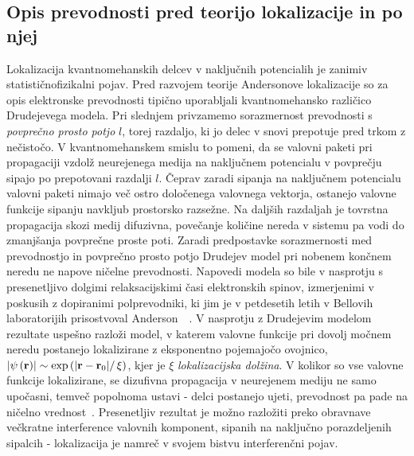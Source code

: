  \subsection{Opis prevodnosti pred teorijo lokalizacije in po njej}  
 Lokalizacija kvantnomehanskih delcev v naključnih potencialih je zanimiv statističnofizikalni pojav. Pred razvojem teorije Andersonove lokalizacije so za opis elektronske prevodnosti tipično uporabljali kvantnomehansko različico Drudejevega modela. Pri slednjem privzamemo sorazmernost prevodnosti s \emph{povprečno prosto potjo} $l$, torej razdaljo, ki jo delec v snovi prepotuje pred trkom z nečistočo. V kvantnomehanskem smislu to pomeni, da se valovni paketi pri propagaciji vzdolž neurejenega medija na naključnem potencialu v povprečju sipajo po prepotovani razdalji $l$. Čeprav zaradi sipanja na naključnem potencialu valovni paketi nimajo več ostro določenega valovnega vektorja, ostanejo valovne funkcije sipanju navkljub prostorsko razsežne. Na daljših razdaljah je tovrstna propagacija skozi medij difuzivna, povečanje količine nereda v sistemu pa vodi do zmanjšanja povprečne proste poti. Zaradi predpostavke sorazmernosti med prevodnostjo in povprečno prosto potjo Drudejev model pri nobenem končnem neredu ne napove ničelne prevodnosti. Napovedi modela so bile v nasprotju s presenetljivo dolgimi relaksacijskimi časi elektronskih spinov, izmerjenimi v poskusih z dopiranimi polprevodniki, ki jim je v petdesetih letih v Bellovih laboratorijih prisostvoval Anderson~\cite{lagendijk2009fifty}~\cite{anderson1978local}. V nasprotju z Drudejevim modelom rezultate uspešno razloži model, v katerem valovne funkcije pri dovolj močnem neredu postanejo lokalizirane z eksponentno pojemajočo ovojnico, $\left|\psi\left(\textbf{r}\right)\right|   \sim \exp\left(\left|\textbf{r}- \textbf{r}_0\right|\right/\xi)$, kjer je $\xi$ \emph{lokalizacijska dolžina}. V kolikor so vse valovne funkcije lokalizirane, se dizufivna propagacija v neurejenem mediju ne samo upočasni, temveč popolnoma ustavi - delci postanejo ujeti, prevodnost pa pade na ničelno vrednost~\cite{wolfle2010self}. Presenetljiv rezultat je možno razložiti preko obravnave večkratne interference valovnih komponent, sipanih na naključno porazdeljenih sipalcih - lokalizacija je namreč v svojem bistvu interferenčni pojav. 
